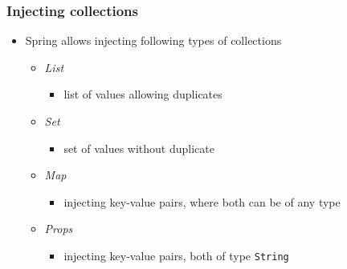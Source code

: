 \documentclass[10pt,xcolor=pdflatex, table]{beamer}
\begin{document}
\begin{frame}[fragile]\frametitle{Injecting collections}
	\begin{itemize}
		\item Spring allows injecting following types of collections
        \medskip
        \begin{itemize}
        	\item \emph{List}
              \begin{itemize}
            	\item list of values allowing duplicates
              \end{itemize}
            \item \emph{Set}
              \begin{itemize}
            	\item set of values without duplicate
              \end{itemize}
            \item \emph{Map}
              \begin{itemize}
            	\item injecting key-value pairs, where both can be of any type
              \end{itemize}
            \item \emph{Props}
              \begin{itemize}
            	\item injecting key-value pairs, both of type \texttt{String}
              \end{itemize}
        \end{itemize}
	\end{itemize}
\end{frame}
\end{document}
